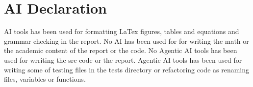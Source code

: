 \section*{AI Declaration}
AI tools has been used for formatting LaTex figures, tables and equations and grammar checking in the report.
No AI has been used for for writing the math or the academic content of the report or the code.
No Agentic AI tools has been used for wrriting the src code or the report.
Agentic AI tools has been used for writing some of testing files in the tests directory or refactoring code as renaming files, variables or functions.
